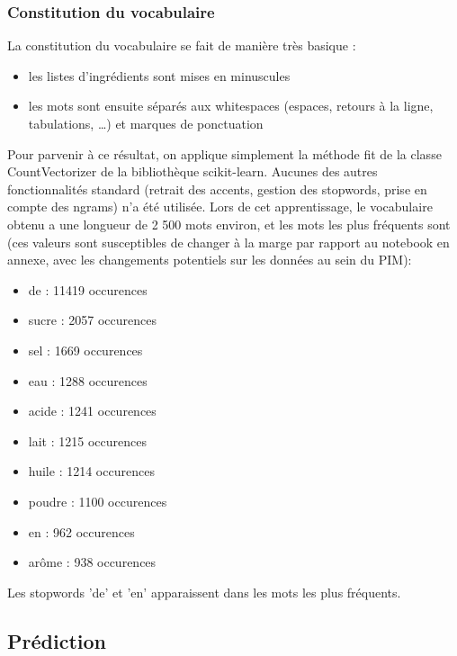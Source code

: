             \subsubsection{Constitution du vocabulaire}

            La constitution du vocabulaire se fait de manière très basique : 
            \begin{itemize}
                \item les listes d'ingrédients sont mises en minuscules
                \item les mots sont ensuite séparés aux whitespaces (espaces, retours à la ligne, tabulations, \dots) et marques de ponctuation
            \end{itemize}
            Pour parvenir à ce résultat, on applique simplement la méthode fit de la classe CountVectorizer de la bibliothèque scikit-learn.
            Aucunes des autres fonctionnalités standard (retrait des accents, gestion des stopwords, prise en compte des ngrams) n'a été utilisée.
            Lors de cet apprentissage, le vocabulaire obtenu a une longueur de 2 500 mots environ, et les mots les plus fréquents sont (ces valeurs sont susceptibles de changer à la marge par rapport au notebook en annexe, avec les changements potentiels sur les données au sein du PIM):
            \begin{itemize}
                \item de     : 11419 occurences
                \item sucre  :  2057 occurences 
                \item sel    :  1669 occurences
                \item eau    :  1288 occurences
                \item acide  :  1241 occurences
                \item lait   :  1215 occurences
                \item huile  :  1214 occurences
                \item poudre :  1100 occurences
                \item en     :   962 occurences
                \item arôme  :   938 occurences
            \end{itemize}
            Les stopwords 'de' et 'en' apparaissent dans les mots les plus fréquents.
        
        \subsection{Prédiction}
            
